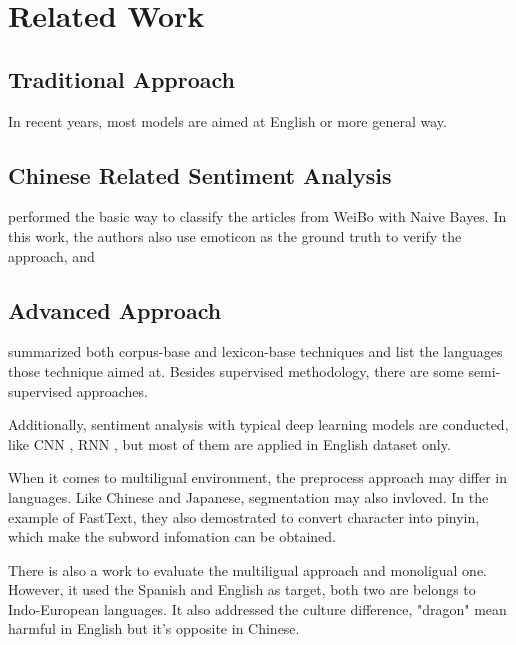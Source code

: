 \chapter{Related Work}


\section{Traditional Approach}

In recent years, most models are aimed at English or more general way. 

\section{Chinese Related Sentiment Analysis}

\cite{zhao2012moodlens} performed the basic way to classify the articles from WeiBo with Naive Bayes. 
In this work, the authors also use emoticon as the ground truth to verify the approach, and   \\


\section{Advanced Approach}


\cite{Dashtipour2016} summarized both corpus-base and lexicon-base techniques and list the languages those technique aimed at. 
Besides supervised methodology, there are some semi-supervised approaches.

Additionally, sentiment analysis with typical deep learning models are conducted, like CNN 
\cite{kim2014convolutional}, RNN \cite{arevian2007recurrent}, but most of them are applied in English dataset only. 

When it comes to multiligual environment, the preprocess approach may differ in languages. Like Chinese and Japanese, segmentation may also invloved.
In the example of FastText\cite{joulin2016fasttext}, they also demostrated to convert character into pinyin, which make the subword infomation can be obtained. 

There is also a work\cite{multilingual} to evaluate the multiligual approach and monoligual one. However, it used the Spanish and English as target, both two are belongs 
to Indo-European languages. It also addressed the culture difference, "dragon" mean harmful in English but it's opposite in Chinese. 
